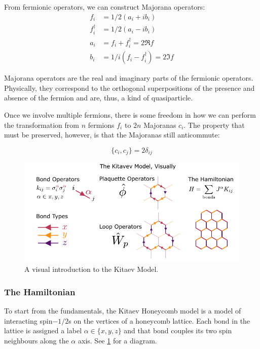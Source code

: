 From fermionic operators, we can construct Majorana operators: \[\begin{aligned}
f_i         &= 1/2 (a_i + ib_i)\\
f^\dagger_i &= 1/2(a_i - ib_i)\\
a_i         &= f_i + f^\dagger_i = 2\Re f\\
b_i         &= 1/i(f_i - f^\dagger_i) = 2\Im f 
\end{aligned}\]

Majorana operators are the real and imaginary parts of the fermionic operators. Physically, they correspond to the orthogonal superpositions of the presence and absence of the fermion and are, thus, a kind of quasiparticle.

Once we involve multiple fermions, there is some freedom in how we can perform the transformation from \(n\) fermions \(f_i\) to \(2n\) Majoranas \(c_i\). The property that must be preserved, however, is that the Majoranas still anticommute:

\[ \{c_i, c_j\} = 2\delta_{ij}\]

\begin{figure}
\hypertarget{fig:visual_kitaev_1}{%
\centering
\includegraphics[width=1\textwidth,height=\textheight]{figure_code/amk_chapter/visual_kitaev_1}
\caption[A Visual Intro to the Kitaev Model]{A visual introduction to the Kitaev
Model.}\label{fig:visual_kitaev_1}
}
\end{figure}

\hypertarget{the-hamiltonian}{%
\subsubsection{The Hamiltonian}\label{the-hamiltonian}}

To start from the fundamentals, the Kitaev Honeycomb model is a model of interacting spin\(-1/2\)s on the vertices of a honeycomb lattice. Each bond in the lattice is assigned a label \(\alpha \in \{ x, y, z\}\) and that bond couples its two spin neighbours along the \(\alpha\) axis. See \cref{fig:visual_kitaev_1} for a diagram.

